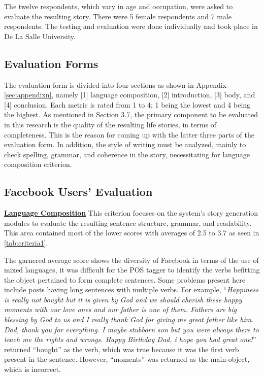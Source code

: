 The twelve respondents, which vary in age and occupation, were asked to evaluate the resulting story. There were 5 female respondents and 7 male respondents. The testing and evaluation were done individually and took place in De La Salle University.

\subsection{Evaluation Forms}
The evaluation form is divided into four sections as shown in Appendix \ref{sec:appendixn}, namely [1] language composition, [2] introduction, [3] body, and [4] conclusion.  Each metric is rated from 1 to 4; 1 being the lowest and 4 being the highest. As mentioned in Section 3.7, the primary component to be evaluated in this research is the quality of the resulting life stories, in terms of completeness. This is the reason for coming up with the latter three parts of the evaluation form. In addition, the style of writing must be analyzed, mainly to check spelling, grammar, and coherence in the story, necessitating for language composition criterion.

\subsection{Facebook Users' Evaluation}
\underline{\textbf{Language Composition}}
This criterion focuses on the system's story generation modules to evaluate the resulting sentence structure, grammar, and readability. This area contained most of the lower scores with averages of 2.5 to 3.7 as seen in \ref{tab:criteria1}.

The garnered average score shows the diversity of Facebook in terms of the use of mixed languages, it was difficult for the POS tagger to identify the verbs befitting the object pertained to form complete sentences. Some problems present here include posts having long sentences with multiple verbs. For example, ``\textit{Happiness is really not bought but it is given by God and we should cherish these happy moments with our love ones and our father is one of them. Fathers are  big blessing by God to us and I really thank God for giving me great father like him. Dad, thank you for everything. I maybe stubborn son but you were always there to teach me the rights and wrongs. Happy Birthday Dad, i hope you had great one!}'' returned ``bought'' as the verb, which was true because it was the first verb present in the sentence. However, ``moments'' was returned as the main object, which is incorrect.

